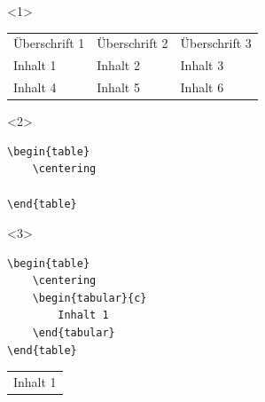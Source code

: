 \begin{frame}[fragile]
	\begin{onlyenv}
	\Ausgabe
	\begin{outputbox}
		\begin{table}
			\centering
			\begin{tabular}{lll}
				Überschrift 1	&	Überschrift 2	&	Überschrift 3	\\
				Inhalt 1		&	Inhalt 2		&	Inhalt 3	\\
				Inhalt 4		&	Inhalt 5		&	Inhalt 6	\\
			\end{tabular}
			\end{table}
		\end{outputbox}
	\end{onlyenv}

	\begin{onlyenv}
		\Code
		\begin{lstlisting}
\begin{table}
	\centering
	
\end{table}
		\end{lstlisting}
		\Ausgabe
		\begin{outputbox}
			\begin{table}
				\centering
	
			\end{table}
		\end{outputbox}
	\end{onlyenv}

	\begin{onlyenv}
		\Code
		\begin{lstlisting}
\begin{table}
	\centering
	\begin{tabular}{c}
		Inhalt 1
	\end{tabular}
\end{table}
		\end{lstlisting}
		\Ausgabe
		\begin{outputbox}
			\begin{table}
				\centering
				\begin{tabular}{c}
					Inhalt 1
				\end{tabular}
			\end{table}
		\end{outputbox}
	\end{onlyenv}
	

\end{frame}
